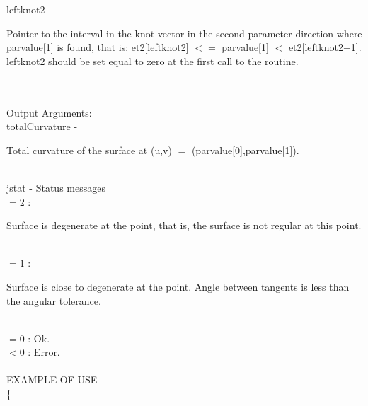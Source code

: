         \>\>    {\fov leftknot2}\> - \>  \begin{minipg2}
                     Pointer to the interval in the knot vector in the
                     second parameter direction where parvalue[1] is found,
                     that is:
                          et2[leftknot2] $<=$ parvalue[1] $<$ et2[leftknot2+1].
                     leftknot2 should be set equal to zero at the first call
                     to the routine.
                               \end{minipg2}\\[0.8ex]
\\
	\>Output Arguments:\\
        \>\>    {\fov totalCurvature}\> - \>  \begin{minipg2}
                     Total curvature of the surface at (u,v) $=$
                     (parvalue[0],parvalue[1]).
                               \end{minipg2}\\[0.8ex]
        \>\>    {\fov jstat}     \> - \> Status messages\\
                \>\>\>\> $= 2$ : 
                       \> \begin{minipg5}  
                               Surface is degenerate at the point, that is,
                               the surface is not regular at this point.
                               \end{minipg5}\\[0.8ex]
                \>\>\>\>  $= 1$ :
                       \> \begin{minipg5}  
                               Surface is close to degenerate at the point.
                               Angle between tangents is less than the angular
                               tolerance.
                               \end{minipg5}\\[0.8ex]
                \>\>\>\> $= 0$ : \> Ok.\\
                \>\>\>\> $< 0$ : \> Error.\\
\\
EXAMPLE OF USE\\
		\>      \{ \\

